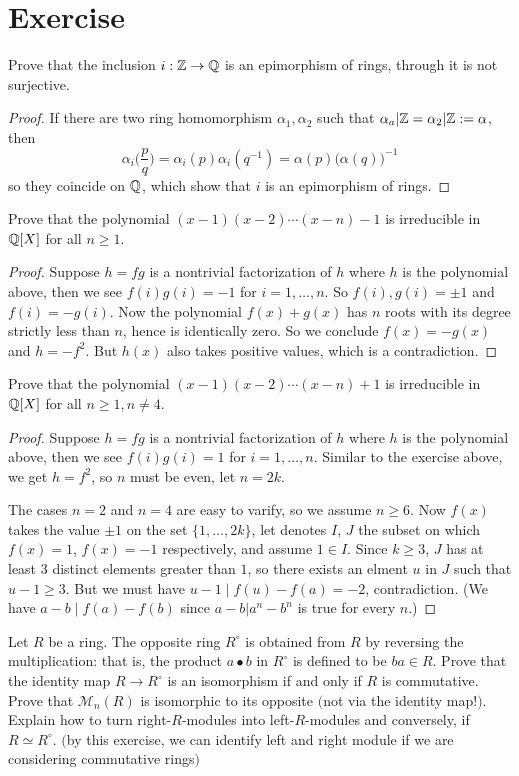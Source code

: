 \section{Exercise}
\begin{exercise}
Prove that the inclusion $i:\mathbb{Z}\to\mathbb{Q}$ is an epimorphism of rings, through it is not surjective.
\end{exercise}
\begin{proof}
If there are two ring homomorphism $\alpha_1,\alpha_2$ such that $\alpha_a|\mathbb{Z}=\alpha_2|\mathbb{Z}:=\alpha$, then 
\[\alpha_i\Big(\dfrac{p}{q}\Big)=\alpha_i(p)\alpha_i(q^{-1})=\alpha(p)\big(\alpha(q)\big)^{-1}\]
so they coincide on $\mathbb{Q}$, which show that $i$ is an epimorphism of rings.
\end{proof}
\begin{exercise}
Prove that the polynomial $(x-1)(x-2)\cdots(x-n)-1$ is irreducible in $\mathbb{Q}[X]$ for all $n\geq 1$.
\end{exercise}
\begin{proof}
Suppose $h=fg$ is a nontrivial factorization of $h$ where $h$ is the polynomial above, then we see $f(i)g(i)=-1$ for $i=1,\dots,n$. So $f(i),g(i)=\pm 1$ and $f(i)=-g(i)$. Now the polynomial $f(x)+g(x)$ has $n$ roots with its degree strictly less than $n$, hence is identically zero. So we conclude $f(x)=-g(x)$ and $h=-f^2$. But $h(x)$ also takes positive values, which is a contradiction.
\end{proof}
\begin{exercise}
Prove that the polynomial $(x-1)(x-2)\cdots(x-n)+1$ is irreducible in $\mathbb{Q}[X]$ for all $n\geq 1, n\neq 4$.
\end{exercise}
\begin{proof}
Suppose $h=fg$ is a nontrivial factorization of $h$ where $h$ is the polynomial above, then we see $f(i)g(i)=1$ for $i=1,\dots,n$. Similar to the exercise above, we get $h=f^2$, so $n$ must be even, let $n=2k$.\par
The cases $n=2$ and $n=4$ are easy to varify, so we assume $n\geq 6$. Now $f(x)$ takes the value $\pm 1$ on the set $\{1,\dots, 2k\}$, let denotes $I$, $J$ the subset on which $f(x)=1$, $f(x)=-1$ respectively, and assume $1\in I$. Since $k\geq 3$, $J$ has at least $3$ distinct elements greater than $1$, so there exists an elment $u$ in $J$ such that $u-1\geq3$. But we must have $u-1\mid f(u)-f(a)=-2$, contradiction. (We have $a-b\mid f(a)-f(b)$ since $a-b|a^n-b^n$ is true for every $n$.)
\end{proof}
\begin{exercise}
Let $R$ be a ring. The opposite ring $R^{\circ}$ is obtained from $R$ by reversing the multiplication: that is, the product $a\bullet b$ in $R^{\circ}$ is defined to be $ba\in R$. Prove that the identity map $R\to R^{\circ}$ is an isomorphism if and only if $R$ is commutative. Prove that $\mathcal{M}_n(R)$ is isomorphic to its opposite $($not via the identity map!$)$. Explain how to turn right-$R$-modules into left-$R$-modules and conversely, if $R\simeq R^{\circ}$. $($by this exercise, we can identify left and right module if we are considering commutative rings$)$
\end{exercise}
